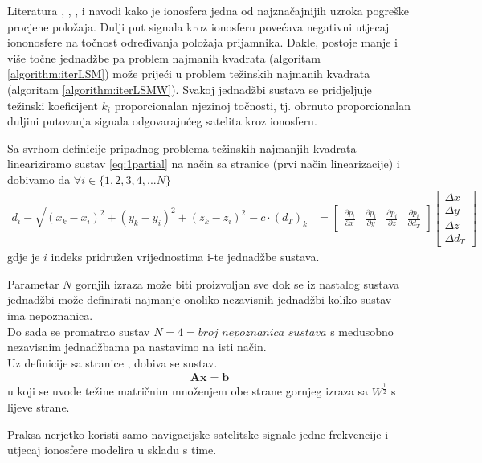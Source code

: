 \documentclass[a4paper,twoside,12pt]{memoir} %
\begin{document}
Literatura \cite{ref:4}, \cite{ref:9}, \cite{ref:10}, \cite{ref:38} i
\cite{ref:34} navodi kako je ionosfera jedna od najznačajnijih uzroka pogreške
procjene položaja.
Dulji put signala kroz ionosferu povećava negativni utjecaj iononosfere na točnost određivanja 
položaja prijamnika. Dakle, postoje manje i više točne jednadžbe pa problem najmanih kvadrata
(algoritam \ref{algorithm:iterLSM}) može prijeći u problem težinskih najmanih kvadrata (algoritam \ref{algorithm:iterLSMW}).
Svakoj jednadžbi sustava se pridjeljuje težinski koeficijent $k_i$ proporcionalan njezinoj točnosti, tj. obrnuto proporcionalan duljini putovanja signala odgovarajućeg satelita kroz ionosferu. 

Sa svrhom definicije pripadnog problema težinskih najmanjih kvadrata lineariziramo sustav \ref{eq:1partial} na način sa stranice \pageref{eq:1partial} (prvi način linearizacije) i dobivamo da $\forall i \in \{1,2,3,4, ... N\}$
\begin{align}
d_i - \sqrt{(x_k-x_i)^{2}+(y_k-y_i)^{2}+(z_k-z_i)^{2}} - c\cdot (d_T)_k & = 
\begin{bmatrix}
\frac{\partial p_i}{\partial x} &
\frac{\partial p_i}{\partial y} &
\frac{\partial p_i}{\partial z} &
\frac{\partial p_i}{\partial d_T}
\end{bmatrix}
\begin{bmatrix}
\Delta x \\
\Delta y \\
\Delta z \\
\Delta d_T
\end{bmatrix}
\end{align}
gdje je $i$ indeks pridružen vrijednostima i-te jednadžbe sustava.


Parametar $N$ gornjih izraza može biti proizvoljan sve dok se iz nastalog sustava jednadžbi može definirati najmanje onoliko nezavisnih jednadžbi koliko sustav ima nepoznanica.\\
Do sada se promatrao sustav $N = 4 = \textit{broj nepoznanica sustava}$ s međusobno nezavisnim jednadžbama pa nastavimo  na isti način.
\\
Uz definicije sa stranice \pageref{eq:definicijaSustava1},
dobiva se sustav.
\begin{align}
\mathbf{A}\mathbf{x} = \mathbf{b}
\end{align} u koji se uvode težine matričnim množenjem obe strane gornjeg izraza sa $W^{\frac{1}{2}}$ s lijeve strane.

Praksa nerjetko koristi samo navigacijske satelitske signale jedne frekvencije i
utjecaj ionosfere modelira u skladu s time. 
\end{document}
